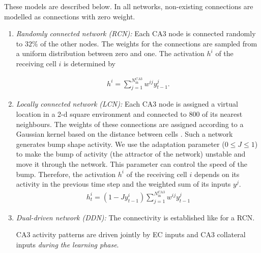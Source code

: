 \documentclass[utf8]{frontiersSCNS} %
\begin{document}
These models are described below.
In all networks, non-existing connections are modelled as connections with zero weight.

\begin{enumerate}
\item \textit{Randomly connected network (RCN):} Each CA3 node is connected randomly to $32\%$ of the other nodes. The weights for the connections are sampled from a uniform distribution between zero and one. The activation $h^i$ of the receiving cell $i$ is determined by

\begin{align}
	\label{activationRCN}
	h^i = \sum_{j=1}^{N^{CA3}_\mathrm{in}} w^{ij}y^{j}_{t-1}.
\end{align}  


\item \textit{Locally connected network (LCN):} Each CA3 node is assigned a virtual location in a 2-d square environment and connected to $800$ of its nearest neighbours. The weights of these connections are assigned according to a Gaussian kernel based on the distance between cells \cite{azizi2013computational}. 
Such a network generates bump shape activity. We use the adaptation parameter ($0 \leq J \leq 1$) to make the bump of activity (the attractor of the network) unstable and move it through the network. This parameter can control the speed of the bump. 
Therefore, the activation $h^i$ of the receiving cell $i$ depends on its activity in the previous time step and the weighted sum of its inputs $y^j$.
\begin{align}
\label{activationLCN}
h^{i}_{t} = (1 - J y^{i}_{t-1}) \sum_{j = 1}^{N^\mathrm{CA3}_\mathrm{in}} {{w^{ij} y^{j}_{t-1}}}
\end{align}

\item \textit{Dual-driven network (DDN):} The connectivity is established like for a RCN.

CA3 activity patterns are driven jointly by EC inputs and CA3 collateral inputs \textit{during the learning phase}.


\end{enumerate}
\end{document}
